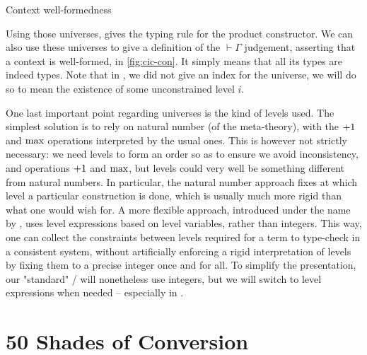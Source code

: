 \begin{marginfigure}
  \ContinuedFloat
  \caption{Context well-formedness}
  \label{fig:cic-con}
\end{marginfigure}

Using those universes,  gives the typing rule for the product constructor. We can also use these universes to give a definition of the $\vdash \Gamma$
judgement, asserting that a context is well-formed, in \cref{fig:cic-con}.
It simply means that all its types
are indeed types. Note that in , we did not give an index for the
universe, we will do so to mean the existence of some unconstrained level $i$.

One last important point regarding universes is the kind of levels used. The simplest solution
is to rely on natural number (of the meta-theory), with the $+1$
and $\max$ operations interpreted by the usual ones.
This is however not strictly necessary: we need levels
to form an order so as to ensure we avoid inconsistency, and operations $+1$ and
$\max$, but levels could very well be something different from natural numbers.
In particular, the natural number approach fixes at which level a particular construction
is done, which is usually much more rigid than what one would wish for.
A more flexible approach, introduced under the name  by
,
uses level expressions based on level variables, rather than integers.
This way, one can collect the constraints between levels required for a
term to type-check in a consistent system, without artificially enforcing a
rigid interpretation of levels by fixing them to a precise integer once and for all.
To simplify the presentation, our "standard" / will nonetheless use integers,
but we will switch to level expressions when needed – especially in .

\section{50 Shades of Conversion}
\label{sec:tech-conversion}

